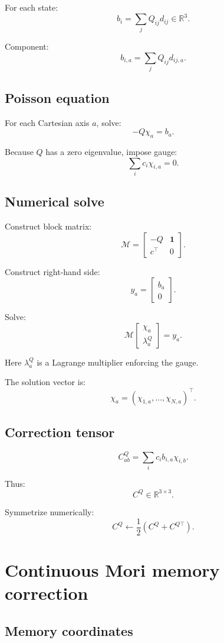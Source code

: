 \documentclass[11pt]{article}
\newcommand{\R}{\mathbb R}
\newcommand{\one}{\mathbf 1}
\begin{document}
For each state:
\[
b_i=\sum_jQ_{ij}d_{ij}\in\R^3.
\]

Component:
\[
b_{i,a}=\sum_jQ_{ij}d_{ij,a}.
\]

\subsection{Poisson equation}

For each Cartesian axis \(a\), solve:
\[
-Q\chi_a=b_a.
\]

Because \(Q\) has a zero eigenvalue, impose gauge:
\[
\sum_i c_i\chi_{i,a}=0.
\]

\subsection{Numerical solve}

Construct block matrix:
\[
\mathcal M
=
\begin{bmatrix}
-Q & \one\\
c^\top & 0
\end{bmatrix}.
\]

Construct right-hand side:
\[
y_a=
\begin{bmatrix}
b_a\\
0
\end{bmatrix}.
\]

Solve:
\[
\mathcal M
\begin{bmatrix}
\chi_a\\
\lambda_a^{Q}
\end{bmatrix}
=
y_a.
\]

Here \(\lambda_a^{Q}\) is a Lagrange multiplier enforcing the gauge.

The solution vector is:
\[
\chi_a=(\chi_{1,a},\ldots,\chi_{N,a})^\top.
\]

\subsection{Correction tensor}

\[
C^Q_{ab}
=
\sum_i c_i b_{i,a}\chi_{i,b}.
\]

Thus:
\[
C^Q\in\R^{3\times3}.
\]

Symmetrize numerically:
\[
C^Q\leftarrow\frac12(C^Q+C^{Q\top}).
\]

\section{Continuous Mori memory correction}
\label{sec:mori}

\subsection{Memory coordinates}
\end{document}
